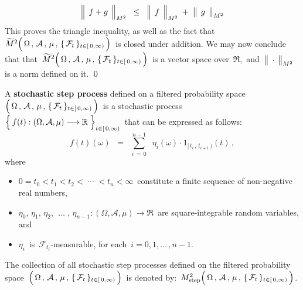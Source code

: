 \begin{equation*}
\left\Vert\;\, \overset{{\color{white}.}}{f} + \overset{{\color{white}.}}{g} \,\;\right\Vert_{M^{2}}
\;\; \leq \;\;
	\left\Vert\;\, \overset{{\color{white}.}}{f} \,\;\right\Vert_{M^{2}}
	\; + \;
	\left\Vert\;\, \overset{{\color{white}.}}{g} \,\;\right\Vert_{M^{2}}
\end{equation*}
This proves the triangle inequality, as well as the fact that
\,$\widetilde{M}^{2}\!\left(\,
	\overset{{\color{white}.}}{\Omega} \,,\, \mathcal{A} \,,\, \mu \,,\, \{\,\mathcal{F}_{t}\,\}_{t \in [\,0,\infty)}
	\,\right)$\,
is closed under addition.
We may now conclude that that
\,$\widetilde{M}^{2}\!\left(\,
	\overset{{\color{white}.}}{\Omega} \,,\, \mathcal{A} \,,\, \mu \,,\, \{\,\mathcal{F}_{t}\,\}_{t \in [\,0,\infty)}
	\,\right)$\,
is a vector space over \,$\Re$,\, and
\,$\left\Vert\;\, \overset{{\color{white}.}}{\cdot} \,\;\right\Vert_{M^{2}}$\,
is a norm defined on it.
\qed


\vskip 0.5cm
\begin{definition}
\mbox{}
\vskip 0.1cm
\noindent
A \textbf{stochastic step process} defined on a filtered probability space
\,$\left(\,\overset{{\color{white}.}}{\Omega} \,,\, \mathcal{A} \,,\, \mu \,,\, \{\,\mathcal{F}_{t}\,\}_{t \in [\,0,\infty)} \,\right)$\,
is a stochastic process
\,$\left\{\,\overset{{\color{white}.}}{f}(t) : (\Omega,\mathcal{A},\mu) \longrightarrow \Re \;\right\}_{t \in[\,0,\infty)}$\,
that can be expressed as follows:
\begin{equation*}
f(t)(\omega)
\;\; = \;\;
	\overset{n-1}{\underset{i\,=\,0}{\sum}}\;\;
	\eta_{i}(\omega) \cdot 1_{[\,t_{i}\,,\,t_{i+1}\,)}(t)\,,
\end{equation*}
where
\begin{itemize}
\item
	$0 = t_{0} < t_{1} < t_{2} < \;\cdots\; < t_{n} < \infty$\,
	constitute a finite sequence of non-negative real numbers, 
\item
	$\eta_{0},\, \eta_{1},\, \eta_{2},\, \;\ldots\; ,\, \eta_{n-1} : (\Omega,\mathcal{A},\mu) \longrightarrow \Re$\,
	are square-integrable random variables, and
\item
	$\eta_{i}$\, is \,$\mathcal{F}_{t_{i}}$-measurable, for each \,$i = 0, 1, \ldots\,, n-1$.
\end{itemize}
The collection of all stochastic step processes defined on
the filtered probability space
\,$\left(\,\overset{{\color{white}.}}{\Omega} \,,\, \mathcal{A} \,,\, \mu \,,\, \{\,\mathcal{F}_{t}\,\}_{t \in [\,0,\infty)} \,\right)$\,
is denoted by:
\,$M^{2}_{\textnormal{step}}\!
\left(\,
	\overset{{\color{white}.}}{\Omega} \,,\, \mathcal{A} \,,\, \mu \,,\, \{\,\mathcal{F}_{t}\,\}_{t \in [\,0,\infty)}
	\,\right)$.
\end{definition}

